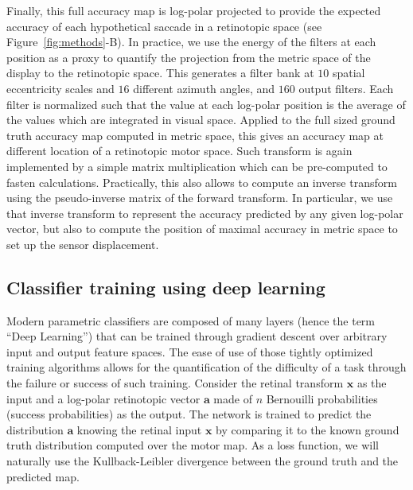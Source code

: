Finally, this full accuracy map is log-polar projected to provide the expected accuracy of each hypothetical saccade in a retinotopic space (see Figure~\ref{fig:methods}-B). In practice, we use the energy of the filters at each position as a proxy to quantify the projection from the metric space of the display to the retinotopic space. This generates a filter bank at $10$ spatial eccentricity scales and $16$ different azimuth angles, and $160$ output filters. Each filter is normalized such that the value at each log-polar position is the average of the values which are integrated in visual space. Applied to the full sized ground truth accuracy map computed in metric space, this gives an accuracy map at different location of a retinotopic motor space. Such transform is again implemented by a simple matrix multiplication which can be pre-computed to fasten calculations. Practically, this also allows to compute an inverse transform using the pseudo-inverse matrix of the forward transform. In particular, we use that inverse transform to represent the accuracy predicted by any given log-polar vector, but also to compute the position of maximal accuracy in metric space to set up the sensor displacement.


\subsection{Classifier training using deep learning}
Modern parametric classifiers are composed of many layers (hence the term ``Deep Learning'') that can be trained through gradient descent over arbitrary input and output feature spaces. The ease of use of those tightly optimized training algorithms allows for the quantification of the difficulty of a task through the failure or success of such training. Consider the retinal transform $\boldsymbol{x}$ as the input and a log-polar retinotopic vector $\boldsymbol{a}$ made of $n$ Bernouilli probabilities (success probabilities) as the output. %
The network is trained to predict the distribution $\boldsymbol{a}$ knowing the retinal input $\boldsymbol{x}$ by comparing it to the known ground truth distribution computed over the motor map. As a loss function, we will naturally use the Kullback-Leibler divergence between the ground truth and the predicted map.

